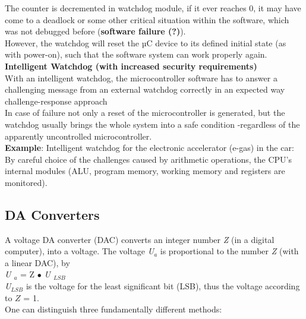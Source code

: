 The counter is decremented in watchdog module, if it ever reaches 0, it may have come to a deadlock or some other critical situation within the software, which was not debugged before (\textbf{software failure (?)}). \\

However, the watchdog will reset the µC device to its defined initial state (as with power-on), such that the software system can work properly again.\\

{\rot\bf Intelligent Watchdog (with increased security requirements)}\\

With an intelligent watchdog, the microcontroller software has to answer a challenging message from an external watchdog correctly in an expected way  challenge-response approach\\

In case of failure not only a reset of the microcontroller is generated, but the watchdog usually brings the whole system into a safe condition -regardless of the apparently uncontrolled microcontroller.\\

\textbf{Example}: Intelligent watchdog for the electronic accelerator (e-gas) in the car:\\
By careful choice of the challenges caused by arithmetic operations, the CPU's internal modules (ALU, program memory, working memory and registers are monitored).
\newpage

\subsection{DA Converters}

A  voltage DA converter (DAC) converts an integer number \textit{Z} (in a digital computer), into a voltage. The voltage \textit{U${}_{a}$} is proportional to the number \textit{Z} (with a linear DAC), by\\

\textit{U ${}_{a}$} = Z $\mathrm{\bullet}$ \textit{U ${}_{LSB}$}\\

\textit{U${}_{LSB}$} is the voltage for the least significant bit (LSB), thus the voltage according to \textit{$Z$} = 1.\\

One can distinguish three fundamentally different methods:

